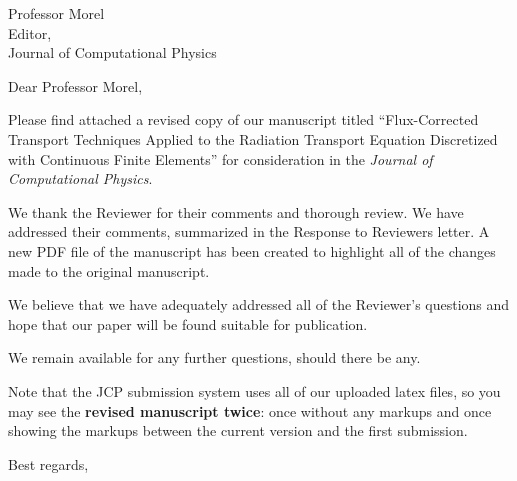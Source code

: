 \begin{letter}{Professor Morel\\
    Editor,\\
    Journal of Computational Physics}
\date{\today}

\opening{Dear Professor Morel,}
         \vspace{0.25cm}

Please find attached a revised copy of our manuscript titled ``Flux-Corrected Transport Techniques Applied to the Radiation Transport Equation Discretized with Continuous Finite Elements'' for consideration in the {\em Journal of Computational Physics}. 

We thank the Reviewer for their comments and thorough review. We have addressed their comments, summarized in the Response to Reviewers letter.  A new PDF file of the manuscript has been created to highlight all of the changes made to the original manuscript. 

We believe that we have adequately addressed all of the Reviewer's questions and hope that our paper will be found suitable for publication.

We remain available for any further questions, should there be any.


Note that the JCP submission system uses all of our uploaded latex files, so you may see the {\bf revised manuscript twice}: once without any markups and once showing the markups between the current version and the first submission.


\vspace{0.25cm}



\closing{Best regards, }

\end{letter}


